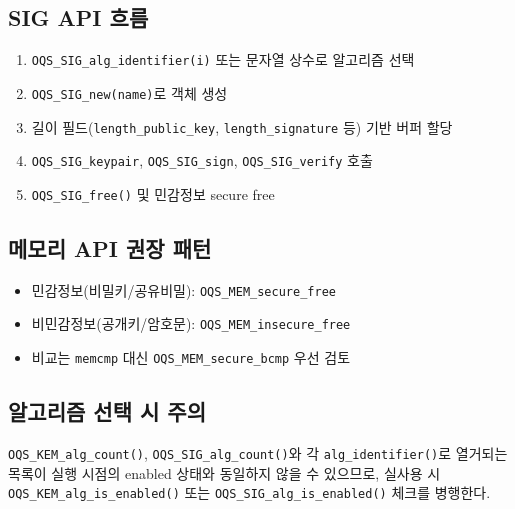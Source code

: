 \subsection{SIG API 흐름}
\begin{enumerate}[leftmargin=*]
\item \texttt{OQS\_SIG\_alg\_identifier(i)} 또는 문자열 상수로 알고리즘 선택
\item \texttt{OQS\_SIG\_new(name)}로 객체 생성
\item 길이 필드(\texttt{length\_public\_key}, \texttt{length\_signature} 등) 기반 버퍼 할당
\item \texttt{OQS\_SIG\_keypair}, \texttt{OQS\_SIG\_sign}, \texttt{OQS\_SIG\_verify} 호출
\item \texttt{OQS\_SIG\_free()} 및 민감정보 secure free
\end{enumerate}

\subsection{메모리 API 권장 패턴}
\begin{itemize}[leftmargin=*]
\item 민감정보(비밀키/공유비밀): \texttt{OQS\_MEM\_secure\_free}
\item 비민감정보(공개키/암호문): \texttt{OQS\_MEM\_insecure\_free}
\item 비교는 \texttt{memcmp} 대신 \texttt{OQS\_MEM\_secure\_bcmp} 우선 검토
\end{itemize}

\subsection{알고리즘 선택 시 주의}
\texttt{OQS\_KEM\_alg\_count()}, \texttt{OQS\_SIG\_alg\_count()}와 각 \texttt{alg\_identifier()}로 열거되는 목록이
실행 시점의 enabled 상태와 동일하지 않을 수 있으므로,
실사용 시 \texttt{OQS\_KEM\_alg\_is\_enabled()} 또는 \texttt{OQS\_SIG\_alg\_is\_enabled()} 체크를 병행한다.
